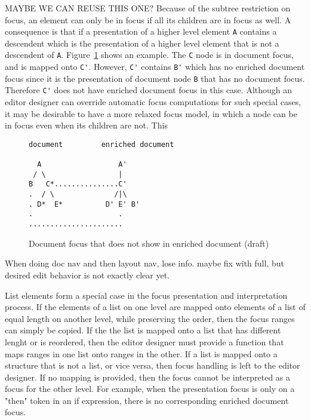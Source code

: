 \bc MAYBE WE CAN REUSE THIS ONE?
Because of the subtree restriction on focus, an element can only be in focus if all its children are in focus as well.  A consequence is that if a presentation of a higher level element \verb|A| contains a descendent which is the presentation of a higher level element that is not a descendent of \verb|A|. Figure~\ref{unpresentableFocus} shows an example. The \verb|C| node is in document focus, and is mapped onto \verb|C'|. However, \verb|C'| contains \verb|B'| which has no enriched document focus since it is the presentation of document node \verb|B| that has no document focus. Therefore \verb|C'| does not have enriched document focus in this case. Although an editor designer can override automatic focus computations for such special cases, it may be desirable to have a more relaxed focus model, in which a node can be in focus even when its children are not. This 

\begin{figure}
\begin{small}
\begin{center}
\begin{verbatim}
document         enriched document

  A                  A'
 / \                 |
B   C*...............C'
.  / \              /|\
. D*  E*          D' E' B'
.                    .
......................    
\end{verbatim}
\caption{Document focus that does not show in enriched document (draft)}\label{unpresentableFocus} 
\end{center}
\end{small}
\end{figure}
\ec

\bc When doing doc nav and then layout nav, lose info. maybe fix with full, but desired edit behavior is not exactly clear yet.
\ec

List elements form a special case in the focus presentation and interpretation process. If the elements of a list on one level are mapped onto elements of a list of equal length on another level, while preserving the order, then the focus ranges can simply be copied. If the the list is mapped onto a list that has different lenght or is reordered, then the editor designer must provide a function that maps ranges in one list onto ranges in the other. If a list is mapped onto a structure that is not a list, or vice versa, then focus handling is left to the editor designer. If no mapping is provided, then the focus cannot be interpreted as a focus for the other level. For example, when the presentation focus is only on a "then" token in an if expression, there is no corresponding enriched document focus.



